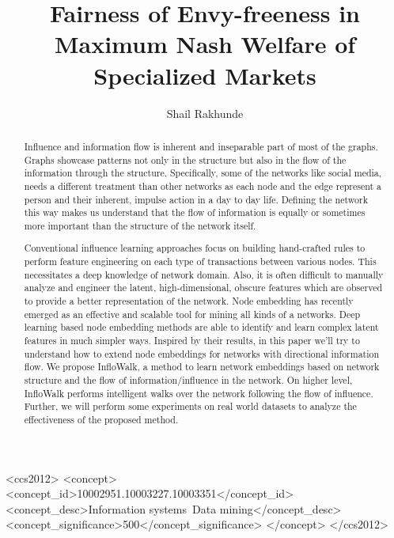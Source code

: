 \documentclass[sigconf]{acmart}
\theoremstyle{plain}
\theoremstyle{definition}
\begin{document}
\title{Fairness of Envy-freeness in Maximum Nash Welfare of Specialized Markets}


\author{Shail Rakhunde}


\begin{abstract}
Influence and information flow is inherent and inseparable part of most of the graphs. Graphs showcase patterns not only in the structure but also in the flow of the information through the structure. Specifically, some of the networks like social media, needs a different treatment than other networks as each node and the edge represent a person and their inherent, impulse action in a day to day life. Defining the network this way makes us understand that the flow of information is equally or sometimes more important than the structure of the network itself.

Conventional influence learning approaches focus on building hand-crafted rules to perform feature engineering on each type of transactions between various nodes. This necessitates a deep knowledge of network domain. Also, it is often difficult to manually analyze and engineer the latent, high-dimensional, obscure features which are observed to provide a better representation of the network. Node embedding has recently emerged as an effective and scalable tool for mining all kinds of a networks. Deep learning based node embedding methods are able to identify and learn complex latent features in much simpler ways. Inspired by their results, in this paper we'll try to understand how to extend node embeddings for networks with directional information flow. We propose InfloWalk, a method to learn network embeddings based on network structure and the flow of information/influence in the network. On higher level, InfloWalk performs intelligent walks over the network following the flow of influence. Further, we will perform some experiments on real world datasets to analyze the effectiveness of the proposed method.


\end{abstract}

%
%
 \begin{CCSXML}
<ccs2012>
<concept>
<concept_id>10002951.10003227.10003351</concept_id>
<concept_desc>Information systems~Data mining</concept_desc>
<concept_significance>500</concept_significance>
</concept>
</ccs2012>
\end{CCSXML}



\maketitle





\end{document}
